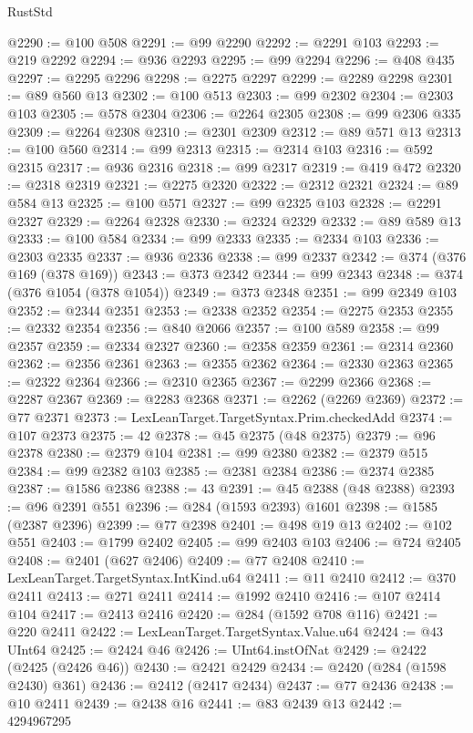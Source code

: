 \begin{lexlean}{RustStd}
\begin{coremodule}
@2290 := @100 @508
@2291 := @99 @2290
@2292 := @2291 @103
@2293 := @219 @2292
@2294 := @936 @2293
@2295 := @99 @2294
@2296 := @408 @435
@2297 := @2295 @2296
@2298 := @2275 @2297
@2299 := @2289 @2298
@2301 := @89 @560 @13
@2302 := @100 @513
@2303 := @99 @2302
@2304 := @2303 @103
@2305 := @578 @2304
@2306 := @2264 @2305
@2308 := @99 @2306 @335
@2309 := @2264 @2308
@2310 := @2301 @2309
@2312 := @89 @571 @13
@2313 := @100 @560
@2314 := @99 @2313
@2315 := @2314 @103
@2316 := @592 @2315
@2317 := @936 @2316
@2318 := @99 @2317
@2319 := @419 @472
@2320 := @2318 @2319
@2321 := @2275 @2320
@2322 := @2312 @2321
@2324 := @89 @584 @13
@2325 := @100 @571
@2327 := @99 @2325 @103
@2328 := @2291 @2327
@2329 := @2264 @2328
@2330 := @2324 @2329
@2332 := @89 @589 @13
@2333 := @100 @584
@2334 := @99 @2333
@2335 := @2334 @103
@2336 := @2303 @2335
@2337 := @936 @2336
@2338 := @99 @2337
@2342 := @374 (@376 @169 (@378 @169))
@2343 := @373 @2342
@2344 := @99 @2343
@2348 := @374 (@376 @1054 (@378 @1054))
@2349 := @373 @2348
@2351 := @99 @2349 @103
@2352 := @2344 @2351
@2353 := @2338 @2352
@2354 := @2275 @2353
@2355 := @2332 @2354
@2356 := @840 @2066
@2357 := @100 @589
@2358 := @99 @2357
@2359 := @2334 @2327
@2360 := @2358 @2359
@2361 := @2314 @2360
@2362 := @2356 @2361
@2363 := @2355 @2362
@2364 := @2330 @2363
@2365 := @2322 @2364
@2366 := @2310 @2365
@2367 := @2299 @2366
@2368 := @2287 @2367
@2369 := @2283 @2368
@2371 := @2262 (@2269 @2369)
@2372 := @77 @2371
@2373 := LexLeanTarget.TargetSyntax.Prim.checkedAdd
@2374 := @107 @2373
@2375 := 42
@2378 := @45 @2375 (@48 @2375)
@2379 := @96 @2378
@2380 := @2379 @104
@2381 := @99 @2380
@2382 := @2379 @515
@2384 := @99 @2382 @103
@2385 := @2381 @2384
@2386 := @2374 @2385
@2387 := @1586 @2386
@2388 := 43
@2391 := @45 @2388 (@48 @2388)
@2393 := @96 @2391 @551
@2396 := @284 (@1593 @2393) @1601
@2398 := @1585 (@2387 @2396)
@2399 := @77 @2398
@2401 := @498 @19 @13
@2402 := @102 @551
@2403 := @1799 @2402
@2405 := @99 @2403 @103
@2406 := @724 @2405
@2408 := @2401 (@627 @2406)
@2409 := @77 @2408
@2410 := LexLeanTarget.TargetSyntax.IntKind.u64
@2411 := @11 @2410
@2412 := @370 @2411
@2413 := @271 @2411
@2414 := @1992 @2410
@2416 := @107 @2414 @104
@2417 := @2413 @2416
@2420 := @284 (@1592 @708 @116)
@2421 := @220 @2411
@2422 := LexLeanTarget.TargetSyntax.Value.u64
@2424 := @43 UInt64
@2425 := @2424 @46
@2426 := UInt64.instOfNat
@2429 := @2422 (@2425 (@2426 @46))
@2430 := @2421 @2429
@2434 := @2420 (@284 (@1598 @2430) @361)
@2436 := @2412 (@2417 @2434)
@2437 := @77 @2436
@2438 := @10 @2411
@2439 := @2438 @16
@2441 := @83 @2439 @13
@2442 := 4294967295

\end{coremodule}
\end{lexlean}
